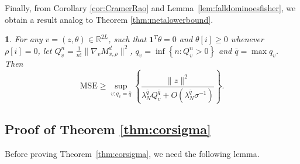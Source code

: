 \documentclass{IEEEtran}
\numberwithin{equation}{section}
\numberwithin{figure}{section}
\theoremstyle{plain}
\theoremstyle{definition}
\theoremstyle{remark}
\theoremstyle{plain}
\theoremstyle{remark}
\theoremstyle{plain}
\newtheorem{corollary}[thm]{\protect\corollaryname}
\theoremstyle{plain}
\theoremstyle{remark}
\providecommand{\corollaryname}{Corollary}
\newcommand{\reals}{\mathbb{R}}
\newcommand{\MSE}{\mathrm{MSE}}
\newcommand{\OO}{{O}}
\newcommand{\ones}{{\mathbf{1}}}
\begin{document}
Finally, from Corollary \ref{cor:CramerRao} and Lemma~\ref{lem:falldominoesfisher}, we obtain a result analog to Theorem \ref{thm:metalowerbound}.

\begin{corollary}\label{lem:lbmetatheorem}
	For any $v=(z,\theta)\in \reals^{2L}$, such that $\ones^T \theta=0$ and $\theta[i]\ge 0$ whenever $\rho[i]= 0$,	let $Q^n_{v}= \frac1{n!}\|\nabla_v M^d_{x,\rho}\|^2$, $q_{v}=\inf\left\{n:Q^n_{v}>0\right\}$ and $\bar q=\max q_{v}$. 
	Then
	\begin{equation}\label{eq:momentscramerrao}
	\MSE\ge \sup_{v: q_v=\bar q}\left\{\frac{\|z\|^2}{\lambda^{\bar q}_N Q^{\bar q}_{v}
		+\OO\left(\lambda^{\bar q}_N \sigma^{-1}\right)}\right\}.
	\end{equation}
\end{corollary}

\subsection{Proof of Theorem \ref{thm:corsigma}}
\label{proof:corsigma}

Before proving Theorem~\ref{thm:corsigma}, we need the following lemma.
\end{document}
